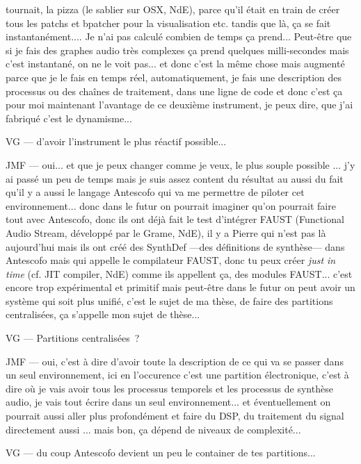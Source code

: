 tournait, la pizza (le sablier sur OSX, NdE), parce qu'il était en train de créer tous les patchs et bpatcher pour la visualisation etc. tandis que là, ça se fait instantanément.... Je n'ai pas calculé combien de temps ça prend... Peut-être que si je fais des graphes audio très complexes ça prend quelques milli-secondes mais c'est instantané, on ne le voit pas... et donc c'est la même chose mais augmenté parce que je le fais en temps réel, automatiquement, je fais une description des processus ou des chaînes de traitement, dans une ligne de code et donc c'est ça pour moi maintenant l'avantage de ce deuxième instrument, je peux dire, que j'ai fabriqué c'est le dynamisme...  

VG — d'avoir l'instrument le plus réactif possible... 

JMF — oui... et que je peux changer comme je veux, le plus souple possible ... j'y ai passé un peu de temps mais je suis assez content du résultat au aussi du fait qu'il y a aussi le langage Antescofo qui va me permettre de piloter cet environnement... donc dans le futur on pourrait imaginer qu'on pourrait faire tout avec Antescofo, donc ils ont déjà fait le test d'intégrer FAUST (Functional Audio Stream, développé par le Grame, NdE), il y a Pierre qui n'est pas là aujourd'hui mais ils ont créé des SynthDef —des définitions de synthèse— dans Antescofo mais qui appelle le compilateur FAUST, donc tu peux créer \textit{just in time} (cf. JIT compiler, NdE) comme ils appellent ça, des modules FAUST... c'est encore trop expérimental et primitif mais peut-être dans le futur on peut avoir un système qui soit plus unifié, c'est le sujet de ma thèse, de faire des partitions centralisées, ça s'appelle mon sujet de thèse...  

VG — Partitions centralisées ? 

JMF — oui, c'est à dire d'avoir toute la description de ce qui va se passer dans un seul environnement, ici en l'occurence c'est une partition électronique, c'est à dire où je vais avoir tous les processus temporels et les processus de synthèse audio, je vais tout écrire dans un seul environnement... et éventuellement on pourrait aussi aller plus profondément et faire du DSP, du traitement du signal directement aussi ... mais bon, ça dépend de niveaux de complexité... 

VG — du coup Antescofo devient un peu le container de tes partitions... 

